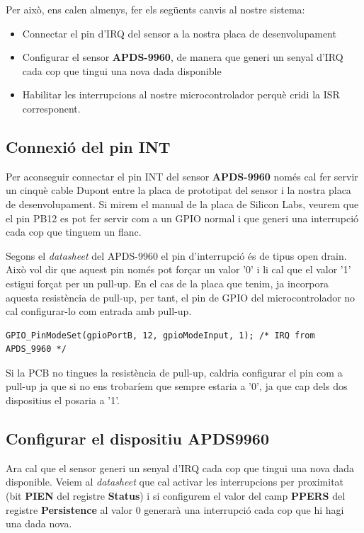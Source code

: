Per això, ens calen almenys, fer els següents canvis al nostre sistema:
\begin{itemize}
 \item Connectar el pin d'\gls{IRQ} del sensor a la nostra placa de desenvolupament
 \item Configurar el sensor {\bf APDS-9960}, de manera que generi un senyal d'IRQ cada cop que tingui una nova dada disponible
 \item Habilitar les interrupcions al nostre microcontrolador perquè cridi la \gls{ISR} corresponent.
\end{itemize}

\subsection{Connexió del pin INT}
Per aconseguir connectar el pin INT del sensor {\bf APDS-9960} només cal fer servir un cinquè cable Dupont entre la placa de prototipat del sensor i la nostra placa de desenvolupament. Si mirem el manual de la placa de Silicon Labs, veurem que el pin PB12 es pot fer servir com a un GPIO normal i que generi una interrupció cada cop que tinguem un flanc.

Segons el {\em datasheet} \cite[3]{apds9960} del APDS-9960 el pin d'interrupció és de tipus \gls{open drain}. Això vol dir que aquest pin només pot forçar un valor '0' i li cal que el valor '1' estigui forçat per un \gls{pull-up}. En el cas de la placa que tenim, ja incorpora aquesta resistència de \gls{pull-up}, per tant, el pin de GPIO del microcontrolador no cal configurar-lo com entrada amb \gls{pull-up}.
\begin{lstlisting}[style=customc]
GPIO_PinModeSet(gpioPortB, 12, gpioModeInput, 1); /* IRQ from APDS_9960 */
\end{lstlisting}

Si la PCB no tingues la resistència de \gls{pull-up}, caldria configurar el pin com a \gls{pull-up} ja que si no ens trobaríem que sempre estaria a '0', ja que cap dels dos dispositius el posaria a '1'.

\subsection{Configurar el dispositiu APDS{\-}9960}
Ara cal que el sensor generi un senyal d'\gls{IRQ} cada cop que tingui una nova dada disponible.
Veiem al {\em datasheet} \cite[11 i 20]{apds9960} que cal activar les interrupcions per proximitat (bit {\bf PIEN} del registre {\bf Status}) i si configurem el valor del camp {\bf PPERS} del registre {\bf Persistence} al valor 0 generarà una interrupció cada cop que hi hagi una dada nova.

